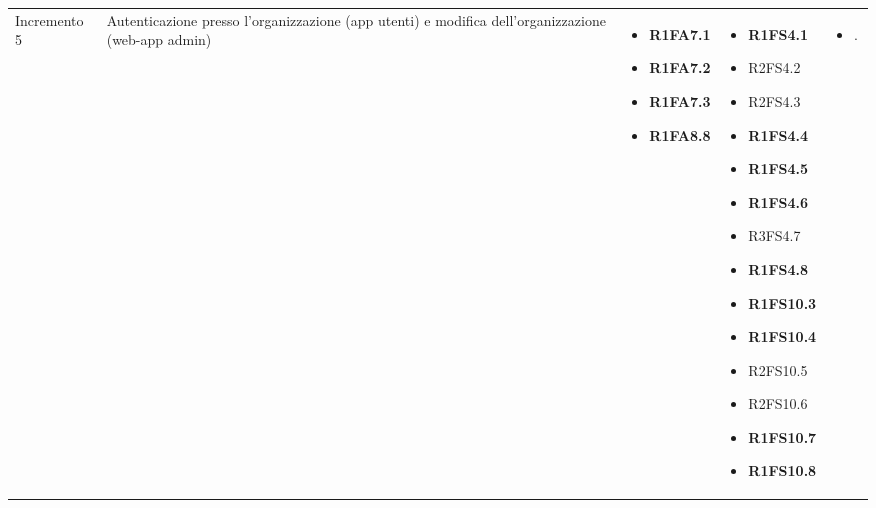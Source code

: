 {\begin{longtable}{C{2.5cm} C{3.2cm} C{2.8cm} C{2.8cm} C{2.8cm}}
Incremento 5 & Autenticazione presso l'organizzazione (app utenti) e modifica dell'organizzazione (web-app admin) & \begin{itemize}
    \item[ ] \textbf{R1FA7.1}
    \item[ ] \textbf{R1FA7.2}
    \item[ ] \textbf{R1FA7.3}
    \item[ ] \textbf{R1FA8.8}
\end{itemize} & \begin{itemize} 
    \item[ ] \textbf{R1FS4.1}
    \item[ ] R2FS4.2
    \item[ ] R2FS4.3
    \item[ ] \textbf{R1FS4.4}
    \item[ ] \textbf{R1FS4.5}
    \item[ ] \textbf{R1FS4.6}
    \item[ ] R3FS4.7
    \item[ ] \textbf{R1FS4.8}
    \item[ ] \textbf{R1FS10.3}
    \item[ ] \textbf{R1FS10.4}
    \item[ ] R2FS10.5
    \item[ ] R2FS10.6
    \item[ ] \textbf{R1FS10.7}
    \item[ ] \textbf{R1FS10.8}
\end{itemize} & \begin{itemize} 
    \item[ ] .
\end{itemize}\\


\end{longtable}}
